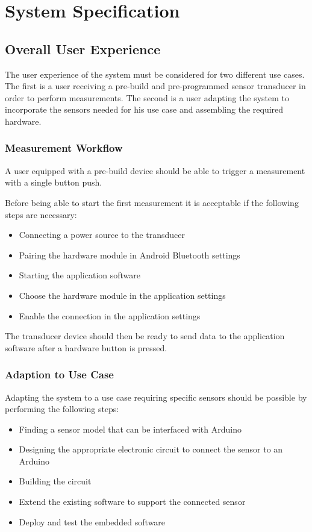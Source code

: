 \chapter{System Specification}
\label{cha:system}

\section{Overall User Experience}
The user experience of the system must be considered for two different use cases. The first is a user receiving a pre-build and pre-programmed sensor transducer in order to perform measurements. The second is a user adapting the system to incorporate the sensors needed for his use case and assembling the required hardware.

\subsection{Measurement Workflow}
A user equipped with a pre-build device should be able to trigger a measurement with a single button push. 

Before being able to start the first measurement it is acceptable if the following steps are necessary:
\begin{itemize}
\item Connecting a power source to the transducer
\item Pairing the hardware module in Android Bluetooth settings
\item Starting the application software
\item Choose the hardware module in the application settings
\item Enable the connection in the application settings
\end{itemize}

The transducer device should then be ready to send data to the application software after a hardware button is pressed.

\subsection{Adaption to Use Case}
Adapting the system to a use case requiring specific sensors should be possible by performing the following steps:

\begin{itemize}
\item Finding a sensor model that can be interfaced with Arduino
\item Designing the appropriate electronic circuit to connect the sensor to an Arduino
\item Building the circuit
\item Extend the existing software to support the connected sensor
\item Deploy and test the embedded software
\end{itemize}

